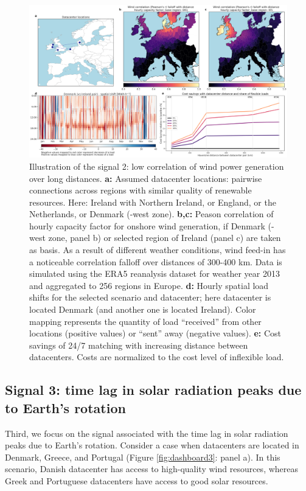 \begin{figure}
    \centering
    \includegraphics[width=\textwidth]{img/dashboard_2.png}
    \caption{Illustration of the signal 2: low correlation of wind power generation over long distances.
    \textbf{a:} Assumed datacenter locations: pairwise connections across regions with similar quality of renewable resources. Here: Ireland with Northern Ireland, or England, or the Netherlands, or Denmark (-west zone).
    \textbf{b,c:} Peason correlation of hourly capacity factor for onshore wind generation, if Denmark (-west zone, panel b) or selected region of Ireland (panel c) are taken as basis. As a result of different weather conditions, wind feed-in has a noticeable correlation falloff over distances of 300-400 km. Data is simulated using the ERA5 reanalysis dataset for weather year 2013 and aggregated to 256 regions in Europe.
    \textbf{d:} Hourly spatial load shifts for the selected scenario and datacenter; here datacenter is located Denmark (and another one is located Ireland). Color mapping represents the quantity of load \enquote{received} from other locations (positive values) or \enquote{sent} away (negative values).
    \textbf{e:} Cost savings of 24/7 matching with increasing distance between datacenters. Costs are normalized to the cost level of inflexible load.}
    \label{fig:dashboard2}
\end{figure}


\subsection{Signal 3: time lag in solar radiation peaks due to Earth's rotation}

Third, we focus on the signal associated with the time lag in solar radiation peaks due to Earth's rotation. Consider a case when datacenters are located in Denmark, Greece, and Portugal (Figure \ref{fig:dashboard3}: panel a). In this scenario, Danish datacenter has access to high-quality wind resources, whereas Greek and Portuguese datacenters have access to good solar resources.

